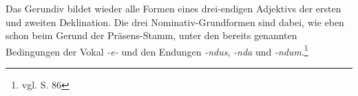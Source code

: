 Das Gerundiv bildet wieder alle Formen eines drei-endigen Adjektivs der ersten und zweiten Deklination. Die drei Nominativ-Grundformen sind dabei, wie eben schon beim Gerund der Präsens-Stamm, unter den bereits genannten Bedingungen der Vokal \textit{-e-} und den Endungen \textit{-ndus}, \textit{-nda} und \textit{-ndum}.\footnote{vgl. \cite{BAYER-LINDAUER1994} S. 86} \par
